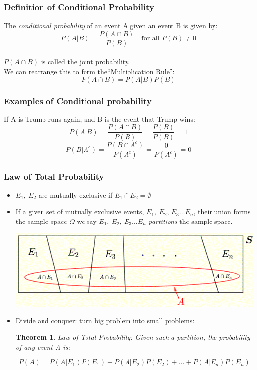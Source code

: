 \documentclass[aspectratio=169, handout]{beamer}
\newtheorem{thm}{Theorem}
\numberwithin{equation}{section}
\begin{document}
\begin{frame}
\frametitle{Definition of Conditional Probability}
The \emph{conditional probability} of an event A given an event B is given by:
$$P(A|B)=\frac{P(A\cap B)}{P(B)}\quad \text{for all }P(B)\neq 0$$
\\
$P(A\cap B)$ is called the joint probability.\\
\pause We can rearrange this to form the``Multiplication Rule'':
$$P(A\cap B)=P(A|B)P(B)$$

\end{frame}


\begin{frame}
\frametitle{Examples of Conditional probability}
If A is Trump runs again, and B is the event that Trump wins:
$$P(A|B)=\frac{P(A\cap B)}{P(B)}=\frac{P(B)}{P(B)}=1$$\pause
$$P(B|A^c)=\frac{P(B\cap A^c)}{P(A^c)}=\frac{0}{P(A^c)}=0$$

\end{frame}



\begin{frame}
\frametitle{Law of Total Probability}

\begin{itemize}
\item $E_1,\  E_2$ are mutually exclusive if $E_1\cap E_2=\emptyset$

\item If a given set of mutually exclusive events, $E_1,\  E_2,\ E_3\ldots E_n$, their union forms the sample space $\Omega$ we say $E_1,\  E_2,\ E_3 \ldots E_n$ \emph{partitions} the sample space. \\ 
\begin{center}
\includegraphics[width=2.5 in]{law-total-probability-diagram.png}
\end{center}
\item Divide and conquer: turn big problem into small problems:
\begin{thm}
Law of Total Probability: 
Given such a partition, the probability of any event A is:

$$P(A)= P(A|E_1)P(E_1)+P(A|E_2)P(E_2)+...+P(A|E_n)P(E_n)$$
\end{thm}
\end{itemize}

\end{frame}
\end{document}
